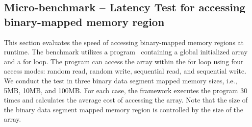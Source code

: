 \subsection{Micro-benchmark – Latency Test for accessing binary-mapped memory region}\label{accesiing_binary_mapped_memory}


    
     
     
     



 

This section evaluates the speed of accessing binary-mapped memory regions at runtime. The benchmark utilizes a program~\cite*{benchamark_micro} containing a global initialized array and a for loop. The program can access the array within the for loop using four access modes: random read, random write, 
sequential read, and sequential write. We conduct the test in three binary data segment mapped memory sizes, i.e., 5MB, 10MB, and 100MB. For each case, the framework executes the program 30 times and calculates the average cost of accessing the array. Note that the size of the binary data segment 
mapped memory region is controlled by the size of the array. 








